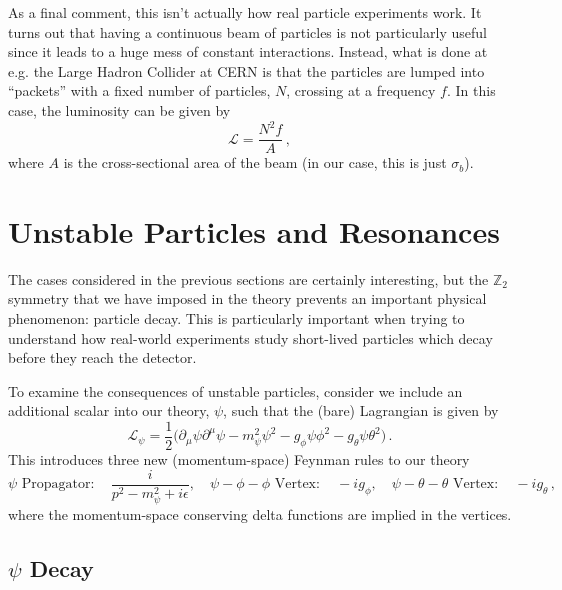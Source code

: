 \documentclass{article}
\numberwithin{equation}{subsection}
\begin{document}
As a final comment, this isn't actually how real particle experiments work. It turns out that having a continuous beam of particles is not particularly useful
since it leads to a huge mess of constant interactions. Instead, what is done at e.g. the Large Hadron Collider at CERN is that the particles are lumped into
``packets'' with a fixed number of particles, $N$, crossing at a frequency $f$. In this case, the luminosity can be given by
\begin{equation}
	\mathcal{L} = \frac{N^2 f}{A}\,,
\end{equation}
where $A$ is the cross-sectional area of the beam (in our case, this is just $\sigma_b$).

\section{Unstable Particles and Resonances}

The cases considered in the previous sections are certainly interesting, but the $\mathbb{Z}_2$ symmetry that we have imposed in the theory
prevents an important physical phenomenon: particle decay. This is particularly important when trying to understand how real-world experiments study
short-lived particles which decay before they reach the detector.

To examine the consequences of unstable particles, consider we include an additional scalar into our theory, $\psi$, such that the (bare) Lagrangian is given
by
\begin{equation}
    \mathcal{L}_{\psi} = \frac{1}{2}\Big(\partial_\mu\psi\partial^\mu \psi - m_\psi^2 \psi^2 - g_\phi \psi\phi^2 - g_\theta \psi \theta^2\Big)\,.
\end{equation}
This introduces three new (momentum-space) Feynman rules to our theory
\begin{equation}
  \text{$\psi$ Propagator}: \quad \frac{i}{p^2 - m_\psi^2 + i\epsilon}, \quad
  \text{$\psi-\phi-\phi$ Vertex}: \quad -i g_\phi, \quad
  \text{$\psi-\theta-\theta$ Vertex}: \quad -i g_\theta\,,
\end{equation}
where the momentum-space conserving delta functions are implied in the vertices.

\subsection{$\psi$ Decay}
\end{document}
